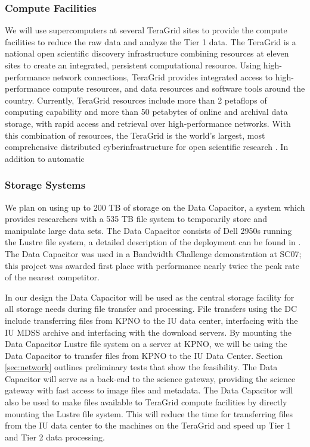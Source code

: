 \documentclass[10pt,conference]{IEEEtran}
\begin{document}
\subsubsection{Compute Facilities}

We will use supercomputers at several TeraGrid sites to provide the compute facilities to reduce the raw data and analyze the Tier 1 data. The TeraGrid is a national open scientific discovery infrastructure combining resources at eleven sites to create an integrated, persistent computational resource. Using high-performance network connections, TeraGrid provides integrated access to high-performance compute resources, and data resources and software tools around the country. Currently, TeraGrid resources include more than 2 petaflops of computing capability and more than 50 petabytes of online and archival data storage, with rapid access and retrieval over high-performance networks. With this combination of resources, the TeraGrid is the world's largest, most comprehensive distributed cyberinfrastructure for open scientific research \cite{teragrid}. In addition to automatic 

\subsubsection{Storage Systems}

We plan on using up to 200 TB of storage on the Data Capacitor, a system which provides researchers with a 535 TB file system to temporarily store and manipulate large data sets. The Data Capacitor consists of Dell 2950s running the Lustre file system, a detailed description of the deployment can be found in \cite{simms2007}. The Data Capacitor was used in a Bandwidth Challenge demonstration at SC07; this project was awarded first place with performance nearly twice the peak rate of the nearest competitor.

In our design the Data Capacitor will be used as the central storage facility for all storage needs during file transfer and processing. File transfers using the DC include transferring files from KPNO to the IU data center, interfacing with the IU MDSS archive and interfacing with the download servers. By mounting the Data Capacitor Lustre file system on a server at KPNO, we will be using the Data Capacitor to transfer files from KPNO to the IU Data Center. Section \ref{sec:network} outlines preliminary tests that show the feasibility. The Data Capacitor will serve as a back-end to the science gateway, providing the science gateway with fast access to image files and metadata. The Data Capacitor will also be used to make files available to TeraGrid compute facilities by directly mounting the Lustre file system. This will reduce the time for transferring files from the IU data center to the machines on the TeraGrid and speed up Tier 1 and Tier 2 data processing.
\end{document}
